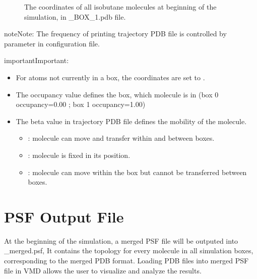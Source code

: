 \documentclass[letterpaper,10pt,english]{sphinxmanual}
\begin{document}
\begin{figure}[htbp]
\centering
\capstart

\noindent{}
\caption{The coordinates of all isobutane molecules at beginning of the simulation, in \_BOX\_1.pdb file.}\label{\detokenize{output_file:id9}}\end{figure}

\begin{sphinxadmonition}{note}{Note:}
The frequency of printing trajectory PDB file is controlled by 
parameter in configuration file.
\end{sphinxadmonition}

\begin{sphinxadmonition}{important}{Important:}\begin{itemize}
\item {} 
For atoms not currently in a box, the coordinates are set to .

\item {} 
The occupancy value defines the box, which molecule is in (box 0 occupancy=0.00 ; box 1 occupancy=1.00)

\item {} 
The beta value in trajectory PDB file defines the mobility of the molecule.
\begin{itemize}
\item {} 
: molecule can move and transfer within and between boxes.

\item {} 
: molecule is fixed in its position.

\item {} 
: molecule can move within the box but cannot be transferred between boxes.

\end{itemize}

\end{itemize}
\end{sphinxadmonition}


\section{PSF Output File}
\label{\detokenize{output_file:psf-output-file}}
At the beginning of the simulation, a merged PSF file will be outputed into \_merged.psf,
It contains the topology for every molecule in all simulation boxes, corresponding to the merged PDB format.
Loading PDB files into merged PSF file in VMD allows the user to visualize and analyze the results.
\end{document}
